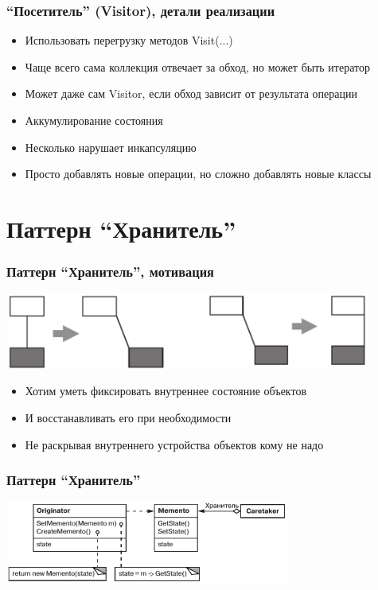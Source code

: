 \documentclass[xetex,mathserif,serif]{beamer}
\begin{document}
	\begin{frame}
		\frametitle{``Посетитель'' (Visitor), детали реализации}
		\begin{itemize}
			\item Использовать перегрузку методов Visit(...)
			\item Чаще всего сама коллекция отвечает за обход, но может быть итератор
			\item Может даже сам Visitor, если обход зависит от результата операции
			\item Аккумулирование состояния
			\item Несколько нарушает инкапсуляцию
			\item Просто добавлять новые операции, но сложно добавлять новые классы
		\end{itemize}
	\end{frame}

	\section{Паттерн ``Хранитель''}

	\begin{frame}
		\frametitle{Паттерн ``Хранитель'', мотивация}
		\begin{center}
			\includegraphics[width=0.9\textwidth]{mementoMotivation.png}
		\end{center}
		\begin{itemize}
			\item Хотим уметь фиксировать внутреннее состояние объектов
			\item И восстанавливать его при необходимости
			\item Не раскрывая внутреннего устройства объектов кому не надо
		\end{itemize}
	\end{frame}

	\begin{frame}
		\frametitle{Паттерн ``Хранитель''}
		\begin{center}
			\includegraphics[width=0.7\textwidth]{memento.png}
		\end{center}
	\end{frame}
\end{document}

